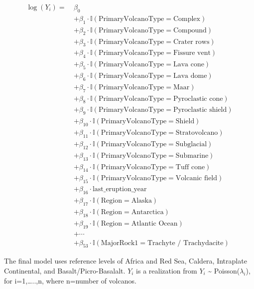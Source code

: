 \documentclass[
  12pt,
]{article}
\begin{document}
\begin{align*}
\log(Y_i) =\ & \beta_0 \\
&+ \beta_1 \cdot \mathbb{I}(\text{PrimaryVolcanoType} = \text{Complex}) \\
&+ \beta_2 \cdot \mathbb{I}(\text{PrimaryVolcanoType} = \text{Compound}) \\
&+ \beta_3 \cdot \mathbb{I}(\text{PrimaryVolcanoType} = \text{Crater rows}) \\
&+ \beta_4 \cdot \mathbb{I}(\text{PrimaryVolcanoType} = \text{Fissure vent}) \\
&+ \beta_5 \cdot \mathbb{I}(\text{PrimaryVolcanoType} = \text{Lava cone}) \\
&+ \beta_6 \cdot \mathbb{I}(\text{PrimaryVolcanoType} = \text{Lava dome}) \\
&+ \beta_7 \cdot \mathbb{I}(\text{PrimaryVolcanoType} = \text{Maar}) \\
&+ \beta_8 \cdot \mathbb{I}(\text{PrimaryVolcanoType} = \text{Pyroclastic cone}) \\
&+ \beta_9 \cdot \mathbb{I}(\text{PrimaryVolcanoType} = \text{Pyroclastic shield}) \\
&+ \beta_{10} \cdot \mathbb{I}(\text{PrimaryVolcanoType} = \text{Shield}) \\
&+ \beta_{11} \cdot \mathbb{I}(\text{PrimaryVolcanoType} = \text{Stratovolcano}) \\
&+ \beta_{12} \cdot \mathbb{I}(\text{PrimaryVolcanoType} = \text{Subglacial}) \\
&+ \beta_{13} \cdot \mathbb{I}(\text{PrimaryVolcanoType} = \text{Submarine}) \\
&+ \beta_{14} \cdot \mathbb{I}(\text{PrimaryVolcanoType} = \text{Tuff cone}) \\
&+ \beta_{15} \cdot \mathbb{I}(\text{PrimaryVolcanoType} = \text{Volcanic field}) \\
&+ \beta_{16} \cdot \text{last\_eruption\_year} \\
&+ \beta_{17} \cdot \mathbb{I}(\text{Region} = \text{Alaska}) \\
&+ \beta_{18} \cdot \mathbb{I}(\text{Region} = \text{Antarctica}) \\
&+ \beta_{19} \cdot \mathbb{I}(\text{Region} = \text{Atlantic Ocean}) \\
&+ \cdots \\
&+ \beta_{53} \cdot \mathbb{I}(\text{MajorRock1} = \text{Trachyte / Trachydacite})
\end{align*}

The final model uses reference levels of Africa and Red Sea, Caldera,
Intraplate Continental, and Basalt/Picro-Basalalt. \(Y_i\) is a
realization from \(Y_i\) \textasciitilde{} Poisson(\(\lambda_i\)), for
i=1,\ldots..,n, where n=number of volcanos.
\end{document}
